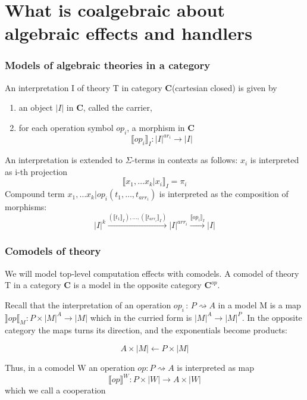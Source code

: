 \documentclass{beamer}
\begin{document}
\section{What is coalgebraic about algebraic effects and handlers}

\begin{frame}
    \frametitle{Models of algebraic theories in a category}
    An interpretation I of theory T in category \textbf{C}(cartesian closed) is given by
    \begin{enumerate}
        \item an object $|I|$ in \textbf{C}, called the carrier,
        \item for each operation symbol $op_i$, a morphism in \textbf{C}
        \[
          \llbracket op_i \rrbracket_I : |I|^{ar_i} \rightarrow |I|  
        \]
    \end{enumerate}

        An interpretation is extended to $\Sigma$-terms in contexts as follows:
        $x_i$ is interpreted as i-th projection
        \[
          \llbracket x_1, \ldots x_k | x_i \rrbracket_I = \pi_i  
        \]
        Compound term $x_1, \ldots x_k | op_i(t_1, \ldots,t_{arr_i})$ is interpreted as the composition of morphisms:
        \[
            |I|^k \xrightarrow{(\llbracket t_1 \rrbracket_I), \ldots, (\llbracket t_{arr_i} \rrbracket_I)}
            |I|^{arr_i} \xrightarrow{ \llbracket op_i \rrbracket_I } |I|
        \]

    \end{frame}
\begin{frame}
    \frametitle{Comodels of theory}
    We will model top-level computation effects with comodels.
    A comodel of theory T in a category \textbf{C} is a model in the opposite category $\textbf{C}^{op}$.

    Recall that the interpretation of an operation $op_i \, : \, P \rightsquigarrow A$ in a model M is a map 
      $\rrbracket op \llbracket_M : P \times |M|^A \rightarrow |M|$
    which in the curried form is $|M|^A \rightarrow |M|^P$.
    In the opposite category the maps turns its direction, and the exponentials become products:
   
     \[ A \times |M| \leftarrow P \times |M| \]

     Thus, in a comodel W an operation $op : P \rightsquigarrow A$ is interpreted as map 
     \[
        \llbracket op \rrbracket^W :  P \times |W| \rightarrow A \times |W|
     \]
     which we call a cooperation
    

\end{frame}
\end{document}
